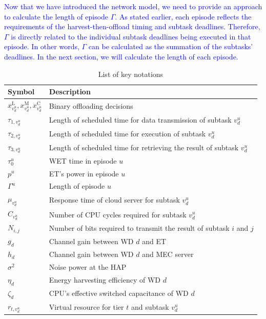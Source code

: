 \documentclass[12pt,draftclsnofoot,onecolumn]{IEEEtran}
\begin{document}
\textcolor{blue}{Now that we have introduced the network model, we need to provide an approach to calculate the length of episode $\Gamma$. As stated earlier, each episode reflects the requirements of the harvest-then-offload timing and subtask deadlines. Therefore, $\Gamma$ is directly related to the individual subtask deadlines being executed in that episode. In other words, $\Gamma$ can be calculated as the summation of the subtasks' deadlines. In the next section, we will calculate the length of each episode.}

\begin{table}
	\centering
	\caption{{\color{blue}List of key notations}}
	\ContinuedFloat
	\label{table1}
	{\color{blue}\begin{tabular}{ |p{2cm}|p{12cm}|}
			\hline
			\textbf{Symbol} & \textbf{Description} \\
			\hline
			$x^{\text{L}}_{v_d^u}, x^{\text{M}}_{v_d^u}, x^{\text{C}}_{v_d^u}$ & Binary offloading decisions \\
			$\tau_{1,v_d^u}$ & Length of scheduled time for data transmission of subtask $v_d^u$ \\
			$\tau_{2,v_d^u}$ & Length of scheduled time for execution of subtask $v_d^u$\\
			$\tau_{3,v_d^u}$ & Length of scheduled time for retrieving the result of subtask $v_d^u$ \\
			$\tau_0^u$ & WET time in episode $u$\\
			$p^{u}$ & ET's power in episode $u$ \\
			$\Gamma^u$ & Length of episode $u$ \\
			$\mu_{v_d^u}$ & Response time of cloud server for subtask $v_d^u$ \\
			$C_{v_d^u}$ & Number of CPU cycles required for subtask $v_d^u$ \\
			$N_{i,j}$ & Number of bits required to transmit the result of subtask $i$ and $j$ \\
			$g_d$ & Channel gain between WD $d$ and ET \\
			$h_d$ & Channel gain between WD $d$ and MEC server \\
			$\sigma^2$ & Noise power at the HAP \\
			$\eta_d$ & Energy harvesting efficiency of WD $d$ \\
			$\zeta_{d}$ & CPU's effective switched capacitance of WD $d$ \\
			$r_{t,v_d^u}$ & Virtual resource for tier $t$ and subtask $v_d^u$ \\

\end{tabular}}
\end{table}
\end{document}
